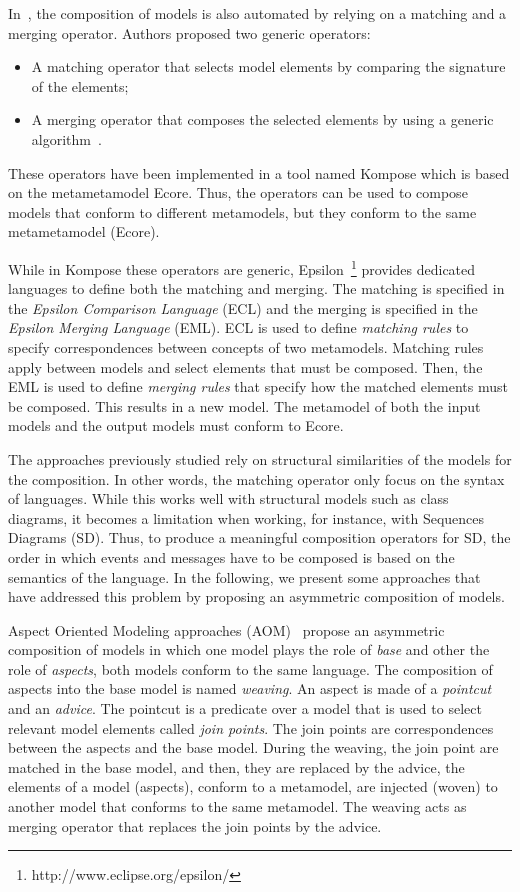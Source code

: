 In~\cite{kompose}, the composition of models is also automated by relying on a matching and a merging operator. Authors proposed two generic operators: 
	\begin{itemize}
		\item A matching operator that selects model elements by comparing the signature of the elements;
		\item A merging operator that composes the selected elements by using a generic algorithm~\cite{signaturecomposebib}.
	\end{itemize}
These operators have been implemented in a tool named Kompose which is based on the metametamodel Ecore. Thus, the operators can be used to compose models that conform to different metamodels, but they conform to the same metametamodel (\ie Ecore).

While in Kompose these operators are generic, Epsilon~\cite{epsilon}\footnote{http://www.eclipse.org/epsilon/} provides dedicated languages to define both the matching and merging. The matching is specified in the \emph{Epsilon Comparison Language} (ECL) and the merging is specified in the \emph{Epsilon Merging Language} (EML). ECL is used to define \emph{matching rules} to specify correspondences between concepts of two metamodels. Matching rules apply between models and select elements that must be composed. Then, the EML is used to define \emph{merging rules} that specify how the matched elements must be composed. This results in a new model. The metamodel of both the input models and the output models must conform to Ecore.

The approaches previously studied rely on structural similarities of the models for the composition. In other words, the matching operator only focus on the syntax of languages. While this works well with structural models such as class diagrams, it becomes a limitation when working, for instance, with Sequences Diagrams (SD). Thus, to produce a meaningful composition operators for SD, the order in which events and messages have to be composed is based on the semantics of the language. In the following, we present some approaches that have addressed this problem by proposing an asymmetric composition of models. 

Aspect Oriented Modeling approaches (AOM)~\cite{sequenceweavingbib,rambib,composdbib} propose an asymmetric composition of models in which one model plays the role of \emph{base} and other the role of \emph{aspects}, both models conform to the same language. The composition of aspects into the base model is named \emph{weaving}. An aspect is made of a \emph{pointcut} and an \emph{advice}. The pointcut is a predicate over a model that is used to select relevant model elements called \emph{join points}. The join points are correspondences between the aspects and the base model. During the weaving, the join point are matched in the base model, and then, they are replaced by the advice, \ie the elements of a model (aspects), conform to a metamodel, are injected (woven) to another model that conforms to the same metamodel. The weaving acts as merging operator that replaces the join points by the advice. 

